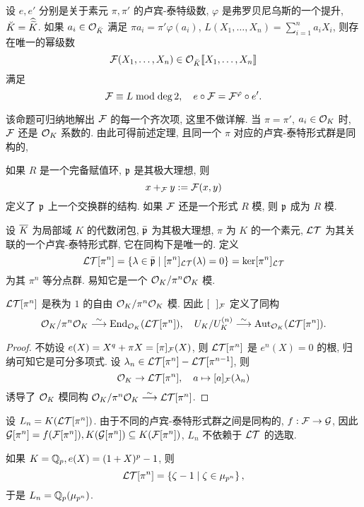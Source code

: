 \begin{proposition}{}{}
设 $e,e'$ 分别是关于素元 $\pi,\pi'$ 的卢宾-泰特级数, $\varphi$ 是弗罗贝尼乌斯的一个提升, ${\breve K}=\widehat{\widetilde K}$.
如果 $a_i\in {\mathcal{O}}_{{\breve K}}$ 满足 $\pi a_i=\pi' \varphi(a_i)$, 
$L(X_1,\dots,X_n)=\sum_{i=1}^na_iX_i$, 则存在唯一的幂级数 
  \[{\mathcal{F}}(X_1,\dots, X_n)\in{\mathcal{O}}_{{\breve K}}\llbracket X_1,\dots,X_n\rrbracket\]
满足
  \[{\mathcal{F}}\equiv L\bmod\deg 2,\quad e\circ {\mathcal{F}}={\mathcal{F}}^{\varphi}\circ e'.\]
\end{proposition}
该命题可归纳地解出 ${\mathcal{F}}$ 的每一个齐次项, 这里不做详解. 当 $\pi=\pi'$, $a_i\in{\mathcal{O}}_K$ 时, ${\mathcal{F}}$ 还是 ${\mathcal{O}}_K$ 系数的. 由此可得前述定理, 且同一个 $\pi$ 对应的卢宾-泰特形式群是同构的, 

如果 $R$ 是一个完备赋值环, ${\mathfrak{p}}$ 是其极大理想, 则 
  \[x+_{\mathcal{F}} y:={\mathcal{F}}(x,y)\]
定义了 ${\mathfrak{p}}$ 上一个交换群的结构. 如果 ${\mathcal{F}}$ 还是一个形式 $R$ 模, 则 ${\mathfrak{p}}$ 成为 $R$ 模.

设 $\overline K$ 为局部域 $K$ 的代数闭包, $\bar {{\mathfrak{p}}}$ 为其极大理想, $\pi$ 为 $K$ 的一个素元, $\mathcal{LT}$ 为其关联的一个卢宾-泰特形式群, 它在同构下是唯一的. 定义
  \[\mathcal{LT}[\pi^n]=\left\{\lambda\in \bar {{\mathfrak{p}}}\mid [\pi^n]_{\mathcal{LT}}(\lambda)=0\right\}=\ker [\pi^n]_{\mathcal{LT}}\]
为其 $\pi^n$ 等分点群. 易知它是一个 ${\mathcal{O}}_K/\pi^n{\mathcal{O}}_K$ 模.

\begin{proposition}{}{}
$\mathcal{LT}[\pi^n]$ 是秩为 $1$ 的自由 ${\mathcal{O}}_K/\pi^n{\mathcal{O}}_K$ 模. 因此 $[~~]_{\mathcal{F}}$ 定义了同构
  \[{\mathcal{O}}_K/\pi^n{\mathcal{O}}_K\stackrel{\sim}{\longrightarrow} {\mathrm{End}}_{{\mathcal{O}}_K}(\mathcal{LT}[\pi^n]),\quad
U_K/U_K^{(n)}\stackrel{\sim}{\longrightarrow} {\mathrm{Aut}}_{{\mathcal{O}}_K}(\mathcal{LT}[\pi^n]).\]
\end{proposition}
\begin{proof}
不妨设 $e(X)=X^q+\pi X=[\pi]_{\mathcal{F}}(X)$, 则 $\mathcal{LT}[\pi^n]$ 是 $e^n(X)=0$ 的根, 归纳可知它是可分多项式. 设 $\lambda_n\in\mathcal{LT}[\pi^n]-\mathcal{LT}[\pi^{n-1}]$, 则
  \[{\mathcal{O}}_K\to \mathcal{LT}[\pi^n],\quad a\mapsto [a]_{\mathcal{F}}(\lambda_n)\]
诱导了 ${\mathcal{O}}_K$ 模同构 ${\mathcal{O}}_K/\pi^n{\mathcal{O}}_K\stackrel{\sim}{\longrightarrow} \mathcal{LT}[\pi^n]$.
\end{proof}

设 $L_n=K(\mathcal{LT}[\pi^n])$. 由于不同的卢宾-泰特形式群之间是同构的, $f:{\mathcal{F}}\to {\mathcal{G}}$, 因此 ${\mathcal{G}}[\pi^n]=f({\mathcal{F}}[\pi^n]), K({\mathcal{G}}[\pi^n])\subseteq K({\mathcal{F}}[\pi^n])$, $L_n$  不依赖于 $\mathcal{LT}$ 的选取.
\begin{example}
如果 $K={\mathbb{Q}}_p,e(X)=(1+X)^p-1$, 则
  \[\mathcal{LT}[\pi^n]=\left\{\zeta-1\mid \zeta\in\mu_{p^n}\right\},\]
于是 $L_n={\mathbb{Q}}_p(\mu_{p^n})$.
\end{example}

